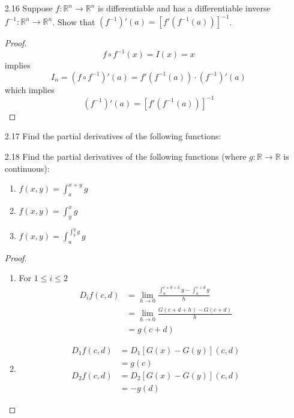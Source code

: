 \begin{enumerate}
\begin{proof}
\begin{enumerate}
        \item The first part follows from Cramer's rule. To find \( s'(t) \) it is enough to apply (b) and the quotient rule. 
    \end{enumerate}
    \end{proof}
    
    \item[2.16] Suppose \( f :\mathbb{R}^n \rightarrow \mathbb{R}^n \) is differentiable and has a differentiable inverse \( f^{-1}: \mathbb{R}^n \rightarrow \mathbb{R}^n \). Show that \( (f^{-1})'(a) = \left[ f'(f^{-1}(a)) \right]^{-1} \).

    \begin{proof}
    \[
        f \circ f^{-1} (x) = I(x) = x
    \]
    implies
    \[
    I_{n} = ( f \circ f^{-1})'(a) = f'(f^{-1}(a))\cdot (f^{-1})'(a)
    \]
    which implies
    \[
    (f^{-1})'(a) = \left[ f'(f^{-1}(a)) \right]^{-1}
    \]
    \end{proof}

    \item[2.17] Find the partial derivatives of the following functions:
    
    \item[2.18] Find the partial derivatives of the following functions (where \( g: \mathbb{R} \rightarrow \mathbb{R} \) is continuous):
    \begin{enumerate}
        \item \( f(x,y) = \int_{a}^{x+y}g \)
        
        \item \( f(x,y) = \int_y^x g \)
        
        \item \( f(x,y) = \int_a^{\int_b^y g} g\)
    \end{enumerate}

    \begin{proof}
    \begin{enumerate}
        \item For \( 1 \leq i \leq 2 \)
        \begin{align*}
            D_if(c,d) &= \lim_{h \rightarrow 0} \frac{\int_a^{c+d+h}g - \int_a^{c+d}g}{h} \\
            &= \lim_{h \rightarrow 0} \frac{G(c+d+h)-G(c+d)}{h}\\
            &= g(c+d)
        \end{align*}
        
        \item 
        \begin{align*}
            D_1f(c,d) &= D_1[G(x)-G(y)](c,d) \\
            &= g(c)\\
            D_2f(c,d) &= D_2[G(x)-G(y)](c,d) \\
            &= -g(d)
        \end{align*}
        

\end{enumerate}
\end{proof}
\end{enumerate}
